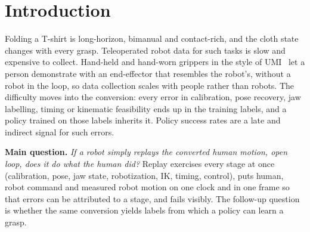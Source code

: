 \documentclass[conference,10pt]{IEEEtran}
\begin{document}
\begin{abstract}
demonstrations grasped the sleeve in real-robot trials on 2 November 2026; the trials were not counted, and after a miss
the policy grasps elsewhere instead of retrying. Back on flattening, a policy trained with the cloth-folding recipe of
UMI on 250 demonstrations under a re-aimed camera improves its offline score from epoch to epoch, and a vision
classifier now labels whether a closed jaw holds the cloth, because the jaw servo has no load signal. Trained on 301
demonstrations with that label in its state, a flattening policy on the robot took both edges of a crumpled shirt and
spread it between the arms (7 November 2026, uncounted runs); it does not yet lay the shirt flat. Since 11 November all
markers are removed: a tag-free variant of the pose chain takes its start pose from tape marks and depth and its heading
from the IMU at rest, and a second policy family (X-VLA) is being fine-tuned on the same data. We report no success rate.
\end{abstract}

\section{Introduction}\label{sec:intro}
Folding a T-shirt is long-horizon, bimanual and contact-rich, and the cloth state changes with every grasp. Teleoperated
robot data for such tasks is slow and expensive to collect. Hand-held and hand-worn grippers in the style of
UMI~\cite{chi2024umi} let a person demonstrate with an end-effector that resembles the robot's, without a robot in the
loop, so data collection scales with people rather than robots. The difficulty moves into the conversion: every error in
calibration, pose recovery, jaw labelling, timing or kinematic feasibility ends up in the training labels, and a policy
trained on those labels inherits it. Policy success rates are a late and indirect signal for such errors.

\textbf{Main question.} \emph{If a robot simply replays the converted human motion, open loop, does it do what the human
did?} Replay exercises every stage at once (calibration, pose, jaw state, robotization, IK, timing, control), puts human,
robot command and measured robot motion on one clock and in one frame so that errors can be attributed to a stage, and
fails visibly. The follow-up question is whether the same conversion yields labels from which a policy can learn a grasp.
\end{document}
